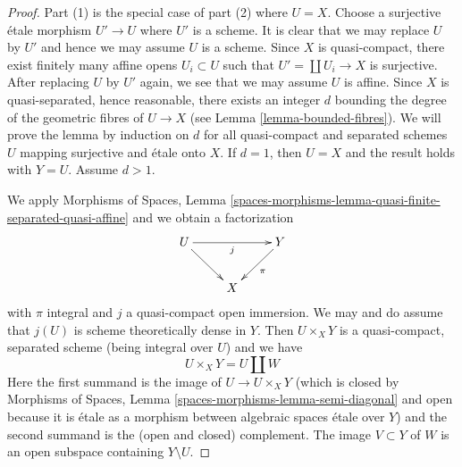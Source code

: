 \documentclass{stacks-project}
\theoremstyle{plain}
\theoremstyle{definition}
\theoremstyle{remark}
\numberwithin{equation}{subsection}
\begin{document}
\begin{proof}
Part (1) is the special case of part (2) where $U = X$.
Choose a surjective \'etale morphism $U' \to U$
where $U'$ is a scheme. It is clear that we may replace $U$ by $U'$
and hence we may assume $U$ is a scheme. Since $X$ is quasi-compact,
there exist finitely many affine opens $U_i \subset U$ such that
$U' = \coprod U_i \to X$ is surjective.
After replacing $U$ by $U'$ again, we see that we may assume $U$ is affine.
Since $X$ is quasi-separated, hence reasonable, there exists an integer
$d$ bounding the degree of the geometric fibres of $U \to X$
(see Lemma \ref{lemma-bounded-fibres}).
We will prove the lemma by induction on $d$ for all quasi-compact
and separated schemes $U$ mapping surjective and \'etale onto $X$.
If $d = 1$, then $U = X$ and the result holds with $Y = U$.
Assume $d > 1$.

\medskip\noindent
We apply Morphisms of Spaces, Lemma
\ref{spaces-morphisms-lemma-quasi-finite-separated-quasi-affine}
and we obtain a factorization
$$
\xymatrix{
U \ar[rr]_j \ar[rd] & & Y \ar[ld]^\pi \\
& X
}
$$
with $\pi$ integral and $j$ a quasi-compact open immersion. We may and do
assume that $j(U)$ is scheme theoretically dense in $Y$. Then $U \times_X Y$
is a quasi-compact, separated scheme (being integral over $U$) and we have
$$
U \times_X Y = U \amalg W
$$
Here the first summand is the image of $U \to U \times_X Y$
(which is closed by
Morphisms of Spaces, Lemma \ref{spaces-morphisms-lemma-semi-diagonal}
and open because it is \'etale as a morphism between
algebraic spaces \'etale over $Y$) and
the second summand is the (open and closed) complement.
The image $V \subset Y$ of $W$ is an open subspace containing
$Y \setminus U$.


\end{proof}
\end{document}
